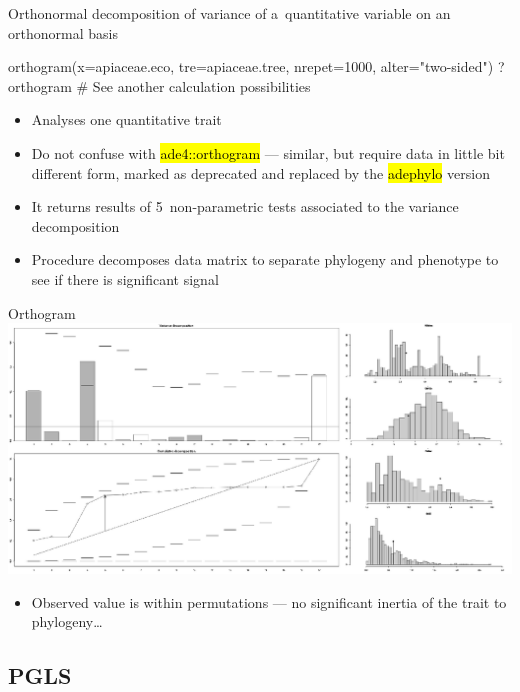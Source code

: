 \documentclass[compress, ucs, xelatex, 11pt, xcolor=svgnames,
	hyperref={
		bookmarks=true,
		unicode=true,
		colorlinks=true,
		pdftitle={Molecular data in R},
		plainpages=false,
		pdfauthor={Vojtech Zeisek},
		pdfsubject={Course about phylogeny and evolution in R},
		pdfcreator={XeLaTeX},
		pdfkeywords={R, evolution, phylogeny, molecular data},
		linkcolor=Tomato,
		anchorcolor=SaddleBrown,
		citecolor=Goldenrod,
		filecolor=DarkMagenta,
		menucolor=Sienna,
		urlcolor=DarkTurquoise,
		pdftex},
	url={hyphens, lowtilde} %
	]{beamer}
\renewcommand{\texttt}[1]{\hl{\ttfamily #1}}
\begin{document}
\begin{frame}[fragile]{Orthonormal decomposition of variance of a~quantitative variable on an orthonormal basis}
	\begin{spluscode}
    orthogram(x=apiaceae.eco, tre=apiaceae.tree, nrepet=1000,
      alter="two-sided")
    ?orthogram # See another calculation possibilities
	\end{spluscode}
	\begin{itemize}
		\item Analyses one quantitative trait
		\item Do not confuse with \texttt{ade4::orthogram} --- similar, but require data in little bit different form, marked as deprecated and replaced by the \texttt{adephylo} version
		\item It returns results of 5~non-parametric tests associated to the variance decomposition
		\item Procedure decomposes data matrix to separate phylogeny and phenotype to see if there is significant signal
	\end{itemize}
\end{frame}

\begin{frame}{Orthogram}
	\includegraphics[width=\textwidth]{orthogram.png}
	\begin{itemize}
		\item Observed value is within permutations --- no significant inertia of the trait to phylogeny\ldots
	\end{itemize}
\end{frame}

\subsection{PGLS}
\end{document}
